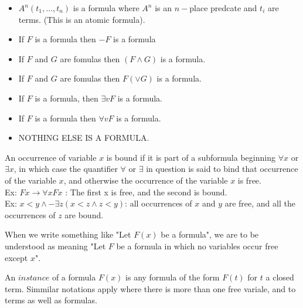 \begin{definition}[Formula]
\begin{itemize}
\item $A^n(t_1,\dots,t_n)$ is a formula where $A^n$ is an $n-$place predcate and $t_i$ are terms. (This is an atomic formula).
\item If $F$ is a formula then $-F$ is a formula
\item If $F$ and $G$ are fomulas then $(F\wedge G)$ is a formula.
\item If $F$ and $G$ are fomulas then $F(\vee G)$ is a formula.
\item If $F$ is a formula, then $\exists vF$ is a formula.
\item If $F$ is a formula then $\forall vF$ is a formula.
\item NOTHING ELSE IS A FORMULA.
\end{itemize}
\end{definition}


\begin{definition}[Bound]

An occurrence of variable $x$ is bound if it is part of a subformula beginning $\forall x$ or $\exists x$, in which case the quantifier $\forall$ or $\exists$ in question is said to bind that occurrence of the variable $x$, and otherwise the occurrence of the variable $x$ is free. \\
Ex: $Fx \rightarrow \forall x F x$ : The first x is free, and the second is bound. \\
Ex: $x < y \wedge - \exists z ( x < z \wedge z < y )$: all occurrences of $x$ and $y$ are free, and all the occurrences of $z$ are bound.
\end{definition}

\begin{remark}
When we write something like "Let $F(x)$ be a formula", we are to be understood as meaning "Let $F$ be a formula in which no variables occur free except $x$".
\end{remark}

\begin{definition}[Instance]
An $instance$ of a formula $F(x)$ is any formula of the form $F(t)$ for $t$ a closed term. Simmilar notations apply where there is more than one free variale, and to terms as well as formulas.
\end{definition}

